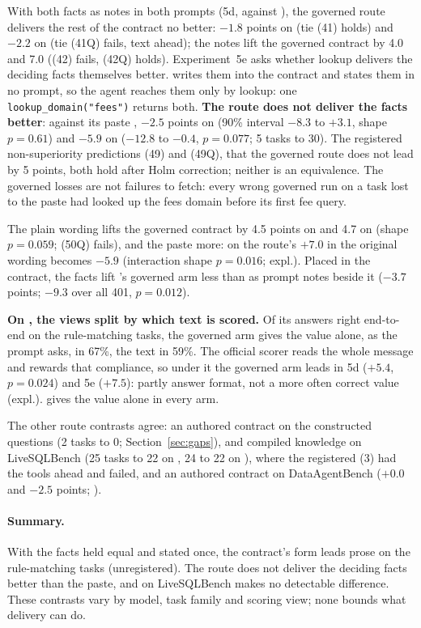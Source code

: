 With both facts as notes in both prompts (5d, \armCws{} against
\armTws{}), the governed route delivers the rest of the contract no
better: $-1.8$ points on \mLuna{} (tie (41) holds) and $-2.2$ on \mQwen{}
(tie (41Q) fails, text ahead); the notes lift the governed contract by 4.0
and 7.0 ((42) fails, (42Q) holds). Experiment~5e asks whether lookup
delivers the deciding facts themselves better. \armCp{} writes them into the contract
and states them in no prompt, so the agent reaches them only by lookup:
one \texttt{lookup\_domain("fees")} returns both. \textbf{The route does
not deliver the facts better}: against its paste \armTp{}, $-2.5$ points
on \mLuna{} (90\% interval $-8.3$ to $+3.1$, shape $p{=}0.61$) and $-5.9$
on \mQwen{} ($-12.8$ to $-0.4$, $p{=}0.077$; 5 tasks to 30). The
registered non-superiority predictions (49) and (49Q), that the governed
route does not lead by 5 points, both hold after Holm correction; neither
is an equivalence. The governed losses are not failures to fetch: every
wrong governed run on a task lost to the paste had looked up the fees
domain before its first fee query.

The plain wording lifts the governed contract by 4.5 points on \mLuna{}
and 4.7 on \mQwen{} (shape $p{=}0.059$; (50Q) fails), and the paste more:
on \mQwen{} the route's $+7.0$ in the original wording becomes $-5.9$
(interaction shape $p{=}0.016$; expl.). Placed in the contract, the facts
lift \mQwen{}'s governed arm less than as prompt notes beside it ($-3.7$
points; $-9.3$ over all 401, $p{=}0.012$).

\textbf{On \mQwen{}, the views split by which text is scored.} Of its
answers right end-to-end on the rule-matching tasks, the governed arm gives
the value alone, as the prompt asks, in 67\%, the text in 59\%. The
official scorer reads the whole message and rewards that compliance, so
under it the governed arm leads in 5d ($+5.4$, $p{=}0.024$) and 5e
($+7.5$): partly answer format, not a more often correct value (expl.).
\mLuna{} gives the value alone in every arm.

The other route contrasts agree: an authored contract on the
constructed questions (2 tasks to 0; Section~\ref{sec:gaps}), and compiled
knowledge on LiveSQLBench (25 tasks to 22 on \mLuna{}, 24 to 22 on
\mQwen{}), where the registered (3) had the tools ahead and failed, and an
authored contract on DataAgentBench ($+0.0$ and $-2.5$ points;
).

\paragraph{Summary.} With the facts held equal and stated once, the
contract's form leads prose on the rule-matching tasks (unregistered). The
route does not deliver the deciding facts better than the paste, and on
LiveSQLBench makes no detectable difference. These contrasts vary by
model, task family and scoring view; none bounds what delivery can do.
